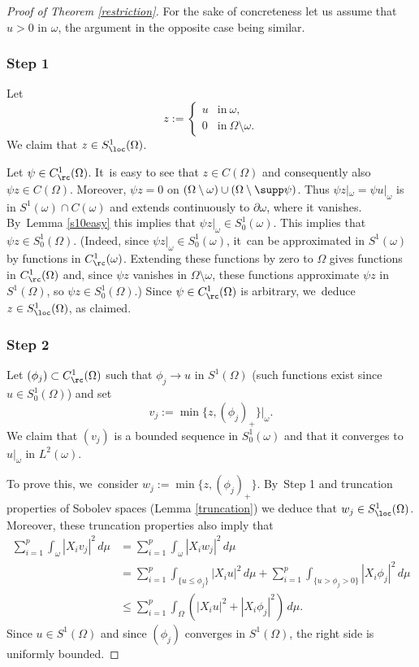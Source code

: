 \begin{proof}[Proof of Theorem \ref{restriction}]
For the sake of concreteness let us assume that $u> 0$ in $\omega$, the argument in the opposite case being similar.

\subsubsection*{Step 1} Let
\[
z:= \begin{cases} u & \text{in}\ \omega,\\ 0 & \text{in}\ \Omega\setminus\omega. \end{cases}
\]
We claim that $z\in S^1_\loc(\Omega)$.

Let $\psi\in C^1_\rc(\Omega)$. It~is easy to see that $z\in C(\Omega)$ and consequently also $\psi z\in C(\Omega)$. Moreover, $\psi z=0$ on $(\Omega\setminus\omega)\cup(\Omega\setminus\supp\psi)$. Thus $\psi z|_\omega = \psi u|_\omega$ is in $S^1(\omega)\cap C(\omega)$ and extends continuously to $\partial\omega$, where it vanishes. By~Lemma \ref{s10easy} this implies that $\psi z|_\omega \in S^1_0(\omega)$. This implies that $\psi z\in S^1_0(\Omega)$. (Indeed, since $\psi z|_\omega\in S^1_0(\omega)$, it~can be approximated in $S^1(\omega)$ by functions in $C^1_\rc(\omega)$. Extending these functions by zero to $\Omega$ gives functions in $C^1_\rc(\Omega)$ and, since $\psi z$ vanishes in $\Omega\setminus\omega$, these functions approximate $\psi z$ in $S^1(\Omega)$, so $\psi z\in S^1_0(\Omega)$.) Since $\psi\in C^1_\rc(\Omega)$ is arbitrary, we~deduce $z\in S^1_\loc(\Omega)$, as claimed.

\subsubsection*{Step 2} Let $(\phi_j)\subset C^1_\rc(\Omega)$ such that $\phi_j\to u$ in $S^1(\Omega)$ (such functions exist since $u\in S^1_0(\Omega)$) and set
\[
v_j := \min\{ z, (\phi_j)_+ \}|_\omega.
\]
We claim that $(v_j)$ is a bounded sequence in $S^1_0(\omega)$ and that it converges to $u|_\omega$ in $L^2(\omega)$.

To prove this, we~consider $w_j:=\min\{ z, (\phi_j)_+ \}$. By~Step 1 and truncation properties of Sobolev spaces (Lemma \ref{truncation}) we deduce that $w_j\in S^1_\loc(\Omega)$. Moreover, these truncation properties also imply that
\begin{align*}
\sum_{i=1}^p \int_\omega |X_i v_j|^2\,d\mu & = \sum_{i=1}^p \int_\omega |X_i w_j|^2\,d\mu \\
& = \sum_{i=1}^p \int_{\{u \leq \phi_j \}} |X_i u|^2\,d\mu + \sum_{i=1}^p \int_{\{ u> \phi_j >0 \}} |X_i \phi_j|^2\,d\mu \\
& \leq \sum_{i=1}^p \int_\Omega (|X_i u|^2 + |X_i \phi_j|^2)\,d\mu.
\end{align*}
Since $u\in S^1(\Omega)$ and since $(\phi_j)$ converges in $S^1(\Omega)$, the right side is uniformly bounded.


\end{proof}
